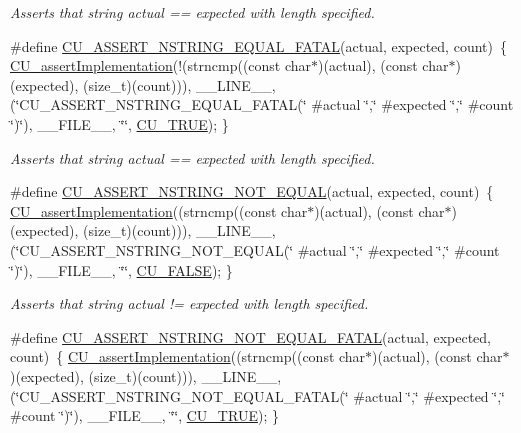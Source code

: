 \begin{DoxyCompactItemize}
\begin{DoxyCompactList}\small\item\em Asserts that string actual == expected with length specified. \end{DoxyCompactList}\item 
\#define \hyperlink{group___framework_ga4677d7fc21073d3e22f2e8dc28409d31}{C\+U\+\_\+\+A\+S\+S\+E\+R\+T\+\_\+\+N\+S\+T\+R\+I\+N\+G\+\_\+\+E\+Q\+U\+A\+L\+\_\+\+F\+A\+T\+A\+L}(actual, expected, count)~\{ \hyperlink{group___framework_gad409fc536d9d3fb5f659c76421e8ce3b}{C\+U\+\_\+assert\+Implementation}(!(strncmp((const char$\ast$)(actual), (const char$\ast$)(expected), (size\+\_\+t)(count))), \+\_\+\+\_\+\+L\+I\+N\+E\+\_\+\+\_\+, (\char`\"{}C\+U\+\_\+\+A\+S\+S\+E\+R\+T\+\_\+\+N\+S\+T\+R\+I\+N\+G\+\_\+\+E\+Q\+U\+A\+L\+\_\+\+F\+A\+T\+A\+L(\char`\"{} \#actual \char`\"{},\char`\"{}  \#expected \char`\"{},\char`\"{} \#count \char`\"{})\char`\"{}), \+\_\+\+\_\+\+F\+I\+L\+E\+\_\+\+\_\+, \char`\"{}\char`\"{}, \hyperlink{group___framework_ga99641394bc766ca9c4a295e942fed1ef}{C\+U\+\_\+\+T\+R\+U\+E}); \}
\begin{DoxyCompactList}\small\item\em Asserts that string actual == expected with length specified. \end{DoxyCompactList}\item 
\#define \hyperlink{group___framework_ga19279e7a9b9b4479996c1ce91dbe03f5}{C\+U\+\_\+\+A\+S\+S\+E\+R\+T\+\_\+\+N\+S\+T\+R\+I\+N\+G\+\_\+\+N\+O\+T\+\_\+\+E\+Q\+U\+A\+L}(actual, expected, count)~\{ \hyperlink{group___framework_gad409fc536d9d3fb5f659c76421e8ce3b}{C\+U\+\_\+assert\+Implementation}((strncmp((const char$\ast$)(actual), (const char$\ast$)(expected), (size\+\_\+t)(count))), \+\_\+\+\_\+\+L\+I\+N\+E\+\_\+\+\_\+, (\char`\"{}C\+U\+\_\+\+A\+S\+S\+E\+R\+T\+\_\+\+N\+S\+T\+R\+I\+N\+G\+\_\+\+N\+O\+T\+\_\+\+E\+Q\+U\+A\+L(\char`\"{} \#actual \char`\"{},\char`\"{}  \#expected \char`\"{},\char`\"{} \#count \char`\"{})\char`\"{}), \+\_\+\+\_\+\+F\+I\+L\+E\+\_\+\+\_\+, \char`\"{}\char`\"{}, \hyperlink{group___framework_ga7453214541b156ef868681eaafe60860}{C\+U\+\_\+\+F\+A\+L\+S\+E}); \}
\begin{DoxyCompactList}\small\item\em Asserts that string actual != expected with length specified. \end{DoxyCompactList}\item 
\#define \hyperlink{group___framework_ga5abbd2ca633ff3a24b996461fe47f1ac}{C\+U\+\_\+\+A\+S\+S\+E\+R\+T\+\_\+\+N\+S\+T\+R\+I\+N\+G\+\_\+\+N\+O\+T\+\_\+\+E\+Q\+U\+A\+L\+\_\+\+F\+A\+T\+A\+L}(actual, expected, count)~\{ \hyperlink{group___framework_gad409fc536d9d3fb5f659c76421e8ce3b}{C\+U\+\_\+assert\+Implementation}((strncmp((const char$\ast$)(actual), (const char$\ast$)(expected), (size\+\_\+t)(count))), \+\_\+\+\_\+\+L\+I\+N\+E\+\_\+\+\_\+, (\char`\"{}C\+U\+\_\+\+A\+S\+S\+E\+R\+T\+\_\+\+N\+S\+T\+R\+I\+N\+G\+\_\+\+N\+O\+T\+\_\+\+E\+Q\+U\+A\+L\+\_\+\+F\+A\+T\+A\+L(\char`\"{} \#actual \char`\"{},\char`\"{}  \#expected \char`\"{},\char`\"{} \#count \char`\"{})\char`\"{}), \+\_\+\+\_\+\+F\+I\+L\+E\+\_\+\+\_\+, \char`\"{}\char`\"{}, \hyperlink{group___framework_ga99641394bc766ca9c4a295e942fed1ef}{C\+U\+\_\+\+T\+R\+U\+E}); \}

\end{DoxyCompactItemize}
